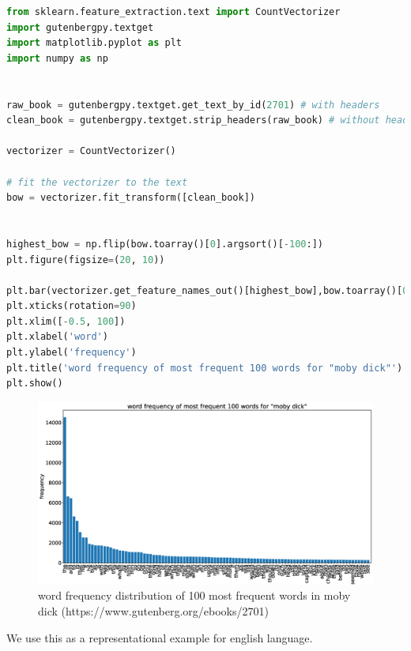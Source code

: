 \begin{lstlisting}[language=Python, caption={word-frequency histogram for Moby Dick}, label={code:moby-raw}]
from sklearn.feature_extraction.text import CountVectorizer
import gutenbergpy.textget
import matplotlib.pyplot as plt
import numpy as np


raw_book = gutenbergpy.textget.get_text_by_id(2701) # with headers
clean_book = gutenbergpy.textget.strip_headers(raw_book) # without headers

vectorizer = CountVectorizer()

# fit the vectorizer to the text
bow = vectorizer.fit_transform([clean_book])


highest_bow = np.flip(bow.toarray()[0].argsort()[-100:])
plt.figure(figsize=(20, 10))

plt.bar(vectorizer.get_feature_names_out()[highest_bow],bow.toarray()[0][highest_bow])
plt.xticks(rotation=90)
plt.xlim([-0.5, 100])
plt.xlabel('word')
plt.ylabel('frequency')
plt.title('word frequency of most frequent 100 words for "moby dick"')
plt.show()
\end{lstlisting}

\begin{figure}[h]
  \centering
  \includegraphics[width=.95\textwidth]{images/moby-raw.eps}
  \caption{word frequency distribution of 100 most frequent words in moby dick (https://www.gutenberg.org/ebooks/2701)}
  \label{fig:word-freq-dist}
\end{figure}
We use this as a representational example for english language.


